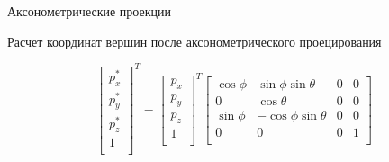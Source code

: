\documentclass{beamer}
\begin{document}
\begin{frame}{Аксонометрические проекции}
{		\begin{center}
			Расчет координат вершин после аксонометрического проецирования
		\end{center}
		\[
			\begin{bmatrix}
				p_x^* \\
				p_y^*	\\
				p_z^* \\
				1			\\
			\end{bmatrix}^T
			= 
			\begin{bmatrix}
				p_x \\
				p_y	\\
				p_z \\
				1		\\
			\end{bmatrix}^T	
			\begin{bmatrix}
				\cos \phi & \sin \phi \sin \theta & 0 & 0 \\
				0 & \cos \theta & 0 & 0 \\
				\sin \phi & -\cos \phi \sin \theta & 0 & 0 \\
				0 & 0 & 0 & 1 \\
			\end{bmatrix}
		\]

	}
	\end{frame}
\end{document}
